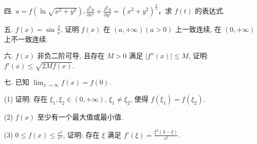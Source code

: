 \documentclass{examcollection}
\begin{document}
{\begin{minipage}{\textwidth}
四. $u = f\left(\ln \sqrt{x^2 + y^2}\right), \frac{\partial^2 u}{\partial x^2} + \frac{\partial^2 u}{\partial y^2} = (x^2 + y^2)^{\frac{3}{2}}$，求 $f(t)$ 的表达式.\par
五. $f(x) = \sin \frac{2}{x}$, 证明 $f(x)$ 在 $(a, +\infty)(a > 0)$ 上一致连续, 在 $(0, +\infty)$ 上不一致连续.\par
六. $f(x)$ 非负二阶可导, 且存在 $M > 0$ 满足 $|f''(x)| \leq M$, 证明: $f'(x) \leq \sqrt{2Mf(x)}$.\par
七. 已知 $\lim_{x\to \infty}f(x) = f(0)$.\par
(1) 证明: 存在 $\xi_1, \xi_2 \in (0, +\infty)$, $\xi_1 \neq \xi_2$, 使得 $f(\xi_1) = f(\xi_2)$.\par
(2) $f(x)$ 至少有一个最大值或最小值.\par
(3) $0 \leq f(x) \leq \frac{x^3}{e^x}$, 证明: 存在 $\xi$ 满足 $f'(\xi) = \frac{\xi^2(3 - \xi)}{e^\xi}$.\par
\end{minipage}}
\ifdim\dimexpr\ht\proofbox+\dp\proofbox\relax>\textheight
\noindent\resizebox{!}{\textheight}{\usebox{\proofbox}}\else\noindent\usebox{\proofbox}\fi\clearpage
\end{document}
